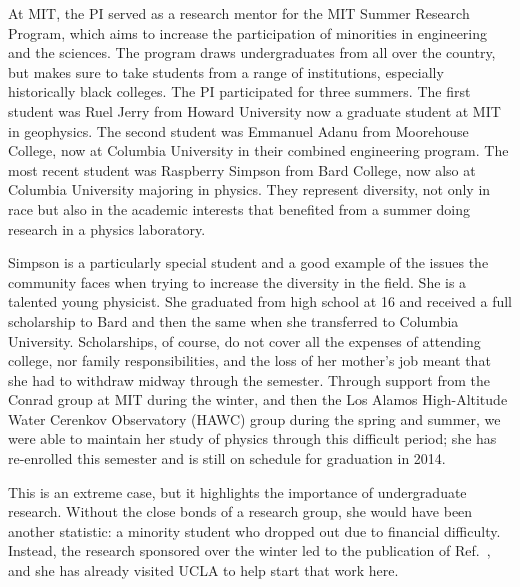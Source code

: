 At MIT, the PI served as a research mentor for the MIT Summer Research Program, which aims to increase the participation of minorities in engineering and the sciences.  The program draws undergraduates from all over the country, but makes sure to take students from a range of institutions, especially historically black colleges. The PI participated for three summers. The first student was Ruel Jerry from Howard University now a graduate student at MIT in geophysics. The second student was Emmanuel Adanu from Moorehouse College, now at Columbia University in their combined engineering program. The most recent student was Raspberry Simpson from Bard College, now also at Columbia University majoring in physics. They represent diversity, not only in race but also in the academic interests that benefited from a summer doing research in a physics laboratory.

Simpson is a particularly special student and a good example of the issues the community faces when trying to increase the diversity in the field. She is a talented young physicist. She graduated from high school at 16 and received a full scholarship to Bard and then the same when she transferred to Columbia University. Scholarships, of course, do not cover all the expenses of attending college, nor family responsibilities, and the loss of her mother's job meant that she had to withdraw midway through the semester. Through support from the Conrad group at MIT during the winter, and then the Los Alamos High-Altitude Water Cerenkov Observatory (HAWC) group during the spring and summer, we were able to maintain her study of physics through this difficult period; she has re-enrolled this semester and is still on schedule for graduation in 2014.

This is an extreme case, but it highlights the importance of undergraduate research. Without the close bonds of a research group, she would have been another statistic: a minority student who dropped out due to financial difficulty. Instead, the research sponsored over the winter led to the publication of Ref.~\cite{qdot}, and she has already visited UCLA to help start that work here.


